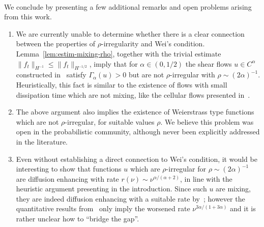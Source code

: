 \documentclass[11pt,oneside,reqno]{amsart}
\newenvironment{enumeratenumeric}{\begin{enumerate}[1.] }{\end{enumerate}}
\numberwithin{equation}{section}
\begin{document}
\

We conclude by presenting a few additional remarks and open problems arising
from this work.
\begin{enumeratenumeric}
  \item We are currently unable to determine whether there is a clear
  connection between the properties of $\rho$-irregularity and Wei's
  condition. Lemma~\ref{lem:estim-mixing-rho}, together with the trivial
  estimate $\| f_t \|_{H^{- 1}} \leqslant \| f_t \|_{H^{- 1 / 2}}$, imply that
  for $\alpha \in (0, 1 / 2)$ the shear flows $u \in C^{\alpha}$ constructed
  in~{\cite{colombozelati}} satisfy $\Gamma_{\alpha} (u) > 0$ but are not
  $\rho$-irregular with $\rho \sim (2 \alpha)^{- 1}$. Heuristically, this fact
  is similar to the existence of flows with small dissipation time which are
  not mixing, like the cellular flows presented in~{\cite{iyer2021}}.
  
  \item The above argument also implies the existence of Weierstrass type
  functions which are not $\rho$-irregular, for suitable values $\rho$. We
  believe this problem was open in the probabilistic community, although never
  been explicitly addressed in the literature.
  
  \item Even without establishing a direct connection to Wei's condition, it
  would be interesting to show that functions $u$ which are $\rho$-irregular
  for $\rho \sim (2 \alpha)^{- 1}$ are diffusion enhancing with rate $r (\nu)
  \sim \nu^{\alpha / (\alpha + 2)}$, in line with the heuristic argument
  presenting in the introduction. Since such $u$ are mixing, they are indeed
  diffusion enhancing with a suitable rate by~{\cite{constantin2008}}; however
  the quantitative results from~{\cite{zelati2020relation}} only imply the
  worsened rate $\nu^{3 \alpha / (1 + 3 \alpha)}$ and it is rather unclear how
  to ``bridge the gap''.
  

\end{enumeratenumeric}
\end{document}
